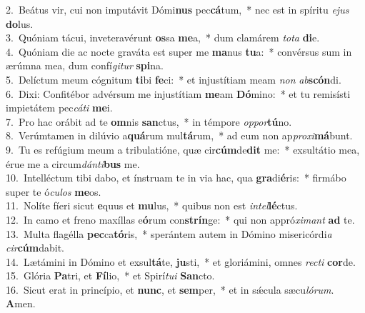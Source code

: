 {2.~}Beátus vir, cui non imputávit Dómi\textbf{nus} pec\textbf{cá}tum,~* nec est in spíritu \textit{e}\textit{jus} \textbf{do}lus.\\
{3.~}Quóniam tácui, inveteravérunt \textbf{os}sa \textbf{me}a,~* dum clamárem \textit{to}\textit{ta} \textbf{di}e.\\
{4.~}Quóniam die ac nocte graváta est super me \textbf{ma}nus \textbf{tu}a:~* convérsus sum in ærúmna mea, dum confí\textit{gi}\textit{tur} \textbf{spi}na.\\
{5.~}Delíctum meum cógnitum \textbf{ti}bi \textbf{fe}ci:~* et injustítiam meam \textit{non} \textit{ab}\textbf{scón}di.\\
{6.~}Dixi: Confitébor advérsum me injustítiam \textbf{me}am \textbf{Dó}mino:~* et tu remisísti impietátem pec\textit{cá}\textit{ti} \textbf{me}i.\\
{7.~}Pro hac orábit ad te \textbf{om}nis \textbf{san}ctus,~* in témpore \textit{op}\textit{por}\textbf{tú}no.\\
{8.~}Verúmtamen in dilúvio a\textbf{quá}rum mul\textbf{tá}rum,~* ad eum non ap\textit{pro}\textit{xi}\textbf{má}bunt.\\
{9.~}Tu es refúgium meum a tribulatióne, quæ cir\textbf{cúm}de\textbf{dit} me:~* exsultátio mea, érue me a circum\textit{dán}\textit{ti}\textbf{bus} me.\\
{10.~}Intelléctum tibi dabo, et ínstruam te in via hac, qua \textbf{gra}di\textbf{é}ris:~* firmábo super te ó\textit{cu}\textit{los} \textbf{me}os.\\
{11.~}Nolíte fíeri sicut \textbf{e}quus et \textbf{mu}lus,~* quibus non est \textit{in}\textit{tel}\textbf{lé}ctus.\\
{12.~}In camo et freno maxíllas e\textbf{ó}rum con\textbf{strín}ge:~* qui non appró\textit{xi}\textit{mant} \textbf{ad} te.\\
{13.~}Multa flagélla \textbf{pec}ca\textbf{tó}ris,~* sperántem autem in Dómino misericórdi\textit{a} \textit{cir}\textbf{cúm}dabit.\\
{14.~}Lætámini in Dómino et exsul\textbf{tá}te, \textbf{ju}sti,~* et gloriámini, omnes \textit{re}\textit{cti} \textbf{cor}de.\\
{15.~}Glória \textbf{Pa}tri, et \textbf{Fí}lio,~* et Spirí\textit{tu}\textit{i} \textbf{San}cto.\\
{16.~}Sicut erat in princípio, et \textbf{nunc}, et \textbf{sem}per,~* et in sǽcula sæcu\textit{ló}\textit{rum}. \textbf{A}men.\\
